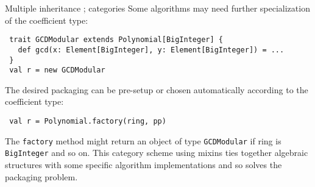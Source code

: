\documentclass[final]{beamer}
\newcommand{\code}[1]{\texttt{#1}}
\begin{document}
\begin{frame}[fragile]
\begin{columns}[t]
\begin{column}{.3\linewidth}
\begin{block}{\large Multiple inheritance ; categories}
{Some algorithms may need further specialization of the coefficient
type:}\par
\begin{lstlisting}
 trait GCDModular extends Polynomial[BigInteger] {
   def gcd(x: Element[BigInteger], y: Element[BigInteger]) = ...
 }
 val r = new GCDModular
\end{lstlisting}
{\footnotesize The desired packaging can be pre-setup or chosen
automatically according to the coefficient type:}\par
\begin{lstlisting}
 val r = Polynomial.factory(ring, pp)
\end{lstlisting}
{\footnotesize The \code{factory} method might return an object of type
\code{GCDModular} if ring is \code{BigInteger} and so on.
This category scheme using mixins ties together algebraic structures
with some specific algorithm implementations and so solves the packaging
problem.}
  \end{block}
\end{column}

\end{columns}

\end{frame}


%
%
%
\end{document}
